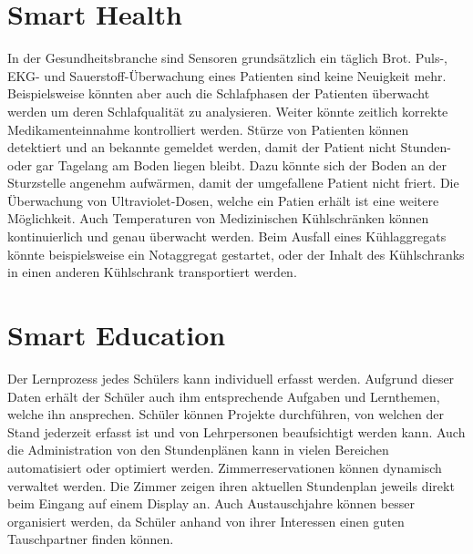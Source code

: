 \section{Smart Health}
In der Gesundheitsbranche sind Sensoren grundsätzlich ein täglich Brot. Puls-, EKG- und Sauerstoff-Überwachung eines Patienten sind keine Neuigkeit mehr. Beispielsweise könnten aber auch die Schlafphasen der Patienten überwacht werden um deren Schlafqualität zu analysieren. Weiter könnte zeitlich korrekte Medikamenteinnahme kontrolliert werden. Stürze von Patienten können detektiert und an bekannte gemeldet werden, damit der Patient nicht Stunden- oder gar Tagelang am Boden liegen bleibt. Dazu könnte sich der Boden an der Sturzstelle angenehm aufwärmen, damit der umgefallene Patient nicht friert. Die Überwachung von Ultraviolet-Dosen, welche ein Patien erhält ist eine weitere Möglichkeit. Auch Temperaturen von Medizinischen Kühlschränken können kontinuierlich und genau überwacht werden. Beim Ausfall eines Kühlaggregats könnte beispielsweise ein Notaggregat gestartet, oder der Inhalt des Kühlschranks in einen anderen Kühlschrank transportiert werden.

\section{Smart Education}
Der Lernprozess jedes Schülers kann individuell erfasst werden. Aufgrund dieser Daten erhält der Schüler auch ihm entsprechende Aufgaben und Lernthemen, welche ihn ansprechen. Schüler können Projekte durchführen, von welchen der Stand jederzeit erfasst ist und von Lehrpersonen beaufsichtigt werden kann. Auch die Administration von den Stundenplänen kann in vielen Bereichen automatisiert oder optimiert werden. Zimmerreservationen können dynamisch verwaltet werden. Die Zimmer zeigen ihren aktuellen Stundenplan jeweils direkt beim Eingang auf einem Display an. Auch Austauschjahre können besser organisiert werden, da Schüler anhand von ihrer Interessen einen guten Tauschpartner finden können.


